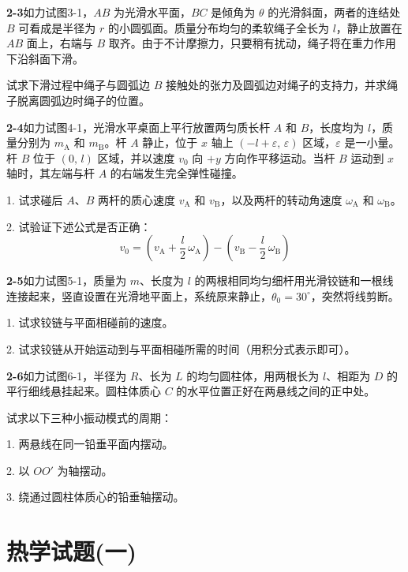\newpage
\textbf{2-3}\quad 如力试图3-1，$AB$ 为光滑水平面，$BC$ 是倾角为 $\theta$ 的光滑斜面，两者的连结处 $B$ 可看成是半径为 $r$ 的小圆弧面。质量分布均匀的柔软绳子全长为 $l$，静止放置在 $AB$ 面上，右端与 $B$ 取齐。由于不计摩擦力，只要稍有扰动，绳子将在重力作用下沿斜面下滑。


试求下滑过程中绳子与圆弧边 $B$ 接触处的张力及圆弧边对绳子的支持力，并求绳子脱离圆弧边时绳子的位置。
\vfill

\textbf{2-4}\quad 如力试图4-1，光滑水平桌面上平行放置两匀质长杆 $A$ 和 $B$，长度均为 $l$，质量分别为 $m_{\mathrm{A}}$ 和 $m_{\mathrm{B}}$。杆 $A$ 静止，位于 $x$ 轴上 $(-l + \varepsilon,\, \varepsilon)$ 区域，$\varepsilon$ 是一小量。杆 $B$ 位于 $(0,\, l)$ 区域，并以速度 $v_{0}$ 向 $+y$ 方向作平移运动。当杆 $B$ 运动到 $x$ 轴时，其左端与杆 $A$ 的右端发生完全弹性碰撞。


1. 试求碰后 $A$、$B$ 两杆的质心速度 $v_{\mathrm{A}}$ 和 $v_{\mathrm{B}}$，以及两杆的转动角速度 $\omega_{\mathrm{A}}$ 和 $\omega_{\mathrm{B}}$。

2. 试验证下述公式是否正确：
$$
v_{0} = \left(v_{\mathrm{A}} + \frac{l}{2}\,\omega_{\mathrm{A}}\right) - \left(v_{\mathrm{B}} - \frac{l}{2}\,\omega_{\mathrm{B}}\right)
$$
\vfill

\newpage
\textbf{2-5}\quad 如力试图5-1，质量为 $m$、长度为 $l$ 的两根相同均匀细杆用光滑铰链和一根线连接起来，竖直设置在光滑地平面上，系统原来静止，$\theta_{0} = 30^{\circ}$，突然将线剪断。


1. 试求铰链与平面相碰前的速度。

2. 试求铰链从开始运动到与平面相碰所需的时间（用积分式表示即可）。
\vfill

\textbf{2-6}\quad 如力试图6-1，半径为 $R$、长为 $L$ 的均匀圆柱体，用两根长为 $l$、相距为 $D$ 的平行细线悬挂起来。圆柱体质心 $C$ 的水平位置正好在两悬线之间的正中处。


试求以下三种小振动模式的周期：

1. 两悬线在同一铅垂平面内摆动。

2. 以 $OO'$ 为轴摆动。

3. 绕通过圆柱体质心的铅垂轴摆动。

\vfill


\section*{热学试题(一)}
\vfill

